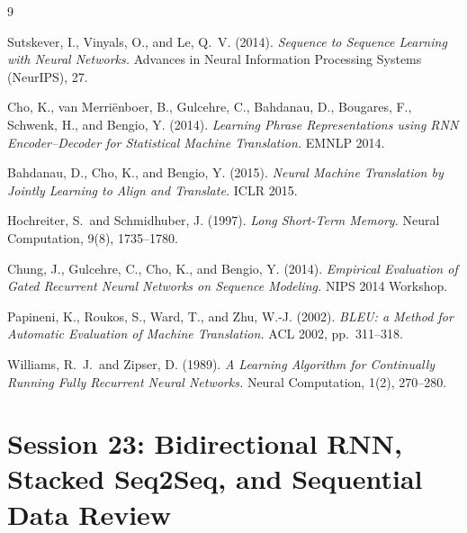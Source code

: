\documentclass[12pt,a4paper]{article}
\begin{document}
\begin{thebibliography}{9}

Sutskever, I., Vinyals, O., and Le, Q.\ V. (2014).
\textit{Sequence to Sequence Learning with Neural Networks.}
Advances in Neural Information Processing Systems (NeurIPS), 27.

Cho, K., van Merri\"{e}nboer, B., Gulcehre, C., Bahdanau, D., Bougares, F.,
Schwenk, H., and Bengio, Y. (2014).
\textit{Learning Phrase Representations using RNN Encoder--Decoder for Statistical Machine Translation.}
EMNLP 2014.

Bahdanau, D., Cho, K., and Bengio, Y. (2015).
\textit{Neural Machine Translation by Jointly Learning to Align and Translate.}
ICLR 2015.

Hochreiter, S.\ and Schmidhuber, J. (1997).
\textit{Long Short-Term Memory.}
Neural Computation, 9(8), 1735--1780.

Chung, J., Gulcehre, C., Cho, K., and Bengio, Y. (2014).
\textit{Empirical Evaluation of Gated Recurrent Neural Networks on Sequence Modeling.}
NIPS 2014 Workshop.

Papineni, K., Roukos, S., Ward, T., and Zhu, W.-J. (2002).
\textit{BLEU: a Method for Automatic Evaluation of Machine Translation.}
ACL 2002, pp.\ 311--318.

Williams, R.\ J.\ and Zipser, D. (1989).
\textit{A Learning Algorithm for Continually Running Fully Recurrent Neural Networks.}
Neural Computation, 1(2), 270--280.

\end{thebibliography}

\clearpage

\part{Session 23: Bidirectional RNN, Stacked Seq2Seq, and Sequential Data Review}

\end{document}
